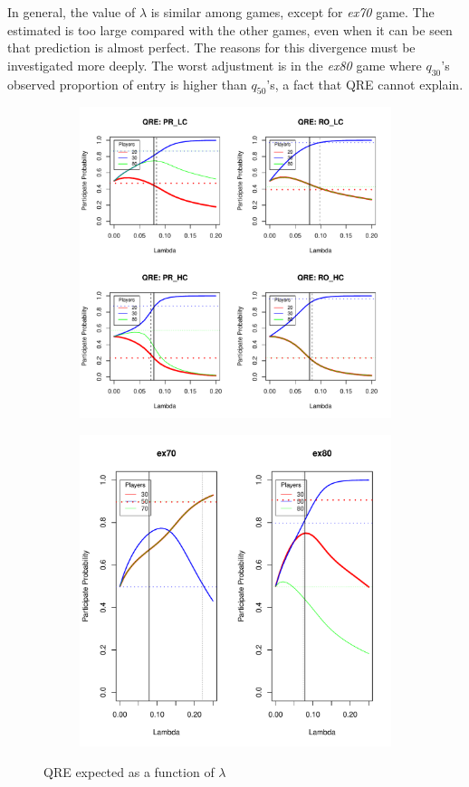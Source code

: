 In general, the value of $\lambda$ is similar among games, except for \textit{ex70} game. The estimated is too large compared with the other games, even when it can be seen that prediction is almost perfect. The reasons for this divergence must be investigated more deeply. The worst adjustment is in the \textit{ex80} game where $q_{30}$'s observed proportion of entry is higher than $q_{50}$'s, a fact that QRE cannot explain.

\begin{figure}
	\begin{subfigure}{0.6\textwidth}
		\includegraphics[width=1\linewidth]{../../results/figures/QRE_lambda_MLE}
		\caption{}
		\label{fig:qrelambdamle}
	\end{subfigure}
	\hfill
	\begin{subfigure}{0.7\textwidth}
		\includegraphics[width=0.6\linewidth]{../../results/figures/1st_treatments_plot}
		\caption{}
		\label{fig:1sttreatmentsplot}
	\end{subfigure}

\caption{QRE expected as a function of $\lambda$}
\label{fig:QRE}
\end{figure}



